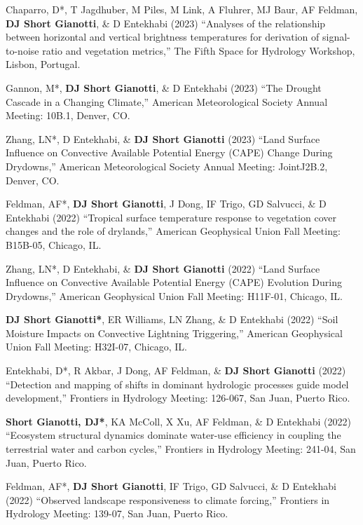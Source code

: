 \documentclass[10pt, a4paper]{article}
\newcommand{\lbr}{\vspace*{12pt}}
\newcommand{\years}[1]{\mbox{}\marginnote{\scriptsize #1}} %
\begin{document}
\years{2023}Chaparro, D*, T Jagdhuber, M Piles, M Link, A Fluhrer, MJ Baur, AF Feldman, \textbf{DJ Short Gianotti}, \& D Entekhabi (2023) ``Analyses of the relationship between horizontal and vertical brightness temperatures for derivation of signal-to-noise ratio and vegetation metrics,'' The Fifth Space for Hydrology Workshop, Lisbon, Portugal.\lbr

\years{2023}Gannon, M*, \textbf{DJ Short Gianotti}, \& D Entekhabi (2023) ``The Drought Cascade in a Changing Climate,'' American Meteorological Society Annual Meeting: 10B.1, Denver, CO.\lbr

\years{2023}Zhang, LN*, D Entekhabi, \& \textbf{DJ Short Gianotti} (2023) ``Land Surface Influence on Convective Available Potential Energy (CAPE) Change During Drydowns,'' American Meteorological Society Annual Meeting: JointJ2B.2, Denver, CO.\lbr
				
\years{2022}Feldman, AF*, \textbf{DJ Short Gianotti}, J Dong, IF Trigo, GD Salvucci, \& D Entekhabi (2022) ``Tropical surface temperature response to vegetation cover changes and the role of drylands,'' American Geophysical Union Fall Meeting: B15B-05, Chicago, IL.\lbr

\years{2022}Zhang, LN*, D Entekhabi, \& \textbf{DJ Short Gianotti} (2022) ``Land Surface Influence on Convective Available Potential Energy (CAPE) Evolution During Drydowns,'' American Geophysical Union Fall Meeting: H11F-01, Chicago, IL.\lbr

\years{2022}\textbf{DJ Short Gianotti*}, ER Williams, LN Zhang, \& D Entekhabi (2022) ``Soil Moisture Impacts on Convective Lightning Triggering,'' American Geophysical Union Fall Meeting: H32I-07, Chicago, IL.\lbr

\years{2022}Entekhabi, D*, R Akbar, J Dong, AF Feldman, \& \textbf{DJ Short Gianotti} (2022) ``Detection and mapping of shifts in dominant hydrologic processes guide model development,'' Frontiers in Hydrology Meeting: 126-067, San Juan, Puerto Rico.\lbr
				
\years{2022}\textbf{Short Gianotti, DJ*}, KA McColl, X Xu, AF Feldman, \& D Entekhabi (2022) ``Ecosystem structural dynamics dominate water-use  efficiency in coupling the terrestrial water and carbon cycles,'' Frontiers in Hydrology Meeting: 241-04, San Juan, Puerto Rico.\lbr

\years{2022}Feldman, AF*, \textbf{DJ Short Gianotti}, IF Trigo, GD Salvucci, \& D Entekhabi (2022) ``Observed landscape responsiveness to climate forcing,'' Frontiers in Hydrology Meeting: 139-07, San Juan, Puerto Rico.\lbr
\end{document}
